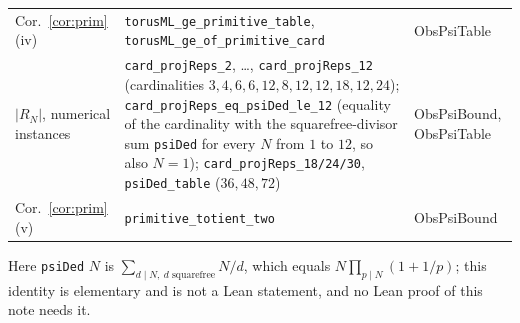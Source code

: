 \documentclass[11pt]{amsart}
\theoremstyle{definition}
\theoremstyle{remark}
\newcommand{\lean}[1]{\texttt{#1}}
\begin{document}
\begin{center}
\begin{tabular}{@{}L{2.8cm}L{6.7cm}L{3.2cm}@{}}
Cor.~\ref{cor:prim}(iv) & \lean{torusML\_ge\_primitive\_table}, \lean{torusML\_ge\_of\_primitive\_card} & ObsPsiTable\\
$|R_N|$, numerical instances & \lean{card\_projReps\_2}, \dots, \lean{card\_projReps\_12} (cardinalities $3,4,6,6,12,8,12,12,18,12,24$); \lean{card\_projReps\_eq\_psiDed\_le\_12} (equality of the cardinality with the squarefree-divisor sum \lean{psiDed} for every $N$ from $1$ to $12$, so also $N=1$); \lean{card\_projReps\_18/24/30}, \lean{psiDed\_table} ($36,48,72$) & ObsPsiBound, ObsPsiTable\\
Cor.~\ref{cor:prim}(v) & \lean{primitive\_totient\_two} & ObsPsiBound\\
\bottomrule
\end{tabular}
\end{center}
Here \lean{psiDed} $N$ is $\sum_{d\mid N,\ d\text{ squarefree}}N/d$, which equals $N\prod_{p\mid N}(1+1/p)$; this identity is elementary and is not a Lean statement, and no Lean proof of this note needs it.
\end{document}

